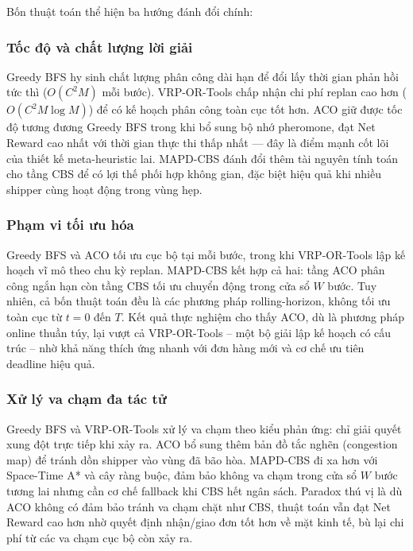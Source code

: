 \documentclass[conference]{IEEEtran}
\begin{document}
Bốn thuật toán thể hiện ba hướng đánh đổi chính:

\subsubsection{Tốc độ và chất lượng lời giải}
Greedy BFS hy sinh chất lượng phân công dài hạn để đổi lấy thời gian phản hồi tức thì ($O(C^2 M)$ mỗi bước). VRP-OR-Tools chấp nhận chi phí replan cao hơn ($O(C^2 M \log M)$) để có kế hoạch phân công toàn cục tốt hơn. ACO giữ được tốc độ tương đương Greedy BFS trong khi bổ sung bộ nhớ pheromone, đạt Net Reward cao nhất với thời gian thực thi thấp nhất --- đây là điểm mạnh cốt lõi của thiết kế meta-heuristic lai. MAPD-CBS đánh đổi thêm tài nguyên tính toán cho tầng CBS để có lợi thế phối hợp không gian, đặc biệt hiệu quả khi nhiều shipper cùng hoạt động trong vùng hẹp.

\subsubsection{Phạm vi tối ưu hóa}
Greedy BFS và ACO tối ưu cục bộ tại mỗi bước, trong khi VRP-OR-Tools lập kế hoạch vĩ mô theo chu kỳ replan. MAPD-CBS kết hợp cả hai: tầng ACO phân công ngắn hạn còn tầng CBS tối ưu chuyển động trong cửa sổ $W$ bước. Tuy nhiên, cả bốn thuật toán đều là các phương pháp rolling-horizon, không tối ưu toàn cục từ $t=0$ đến $T$. Kết quả thực nghiệm cho thấy ACO, dù là phương pháp online thuần túy, lại vượt cả VRP-OR-Tools -- một bộ giải lập kế hoạch có cấu trúc -- nhờ khả năng thích ứng nhanh với đơn hàng mới và cơ chế ưu tiên deadline hiệu quả.

\subsubsection{Xử lý va chạm đa tác tử}
Greedy BFS và VRP-OR-Tools xử lý va chạm theo kiểu phản ứng: chỉ giải quyết xung đột trực tiếp khi xảy ra. ACO bổ sung thêm bản đồ tắc nghẽn (congestion map) để tránh dồn shipper vào vùng đã bão hòa. MAPD-CBS đi xa hơn với Space-Time A* và cây ràng buộc, đảm bảo không va chạm trong cửa sổ $W$ bước tương lai nhưng cần cơ chế fallback khi CBS hết ngân sách. Paradox thú vị là dù ACO không có đảm bảo tránh va chạm chặt như CBS, thuật toán vẫn đạt Net Reward cao hơn nhờ quyết định nhận/giao đơn tốt hơn về mặt kinh tế, bù lại chi phí từ các va chạm cục bộ còn xảy ra.

\end{document}
